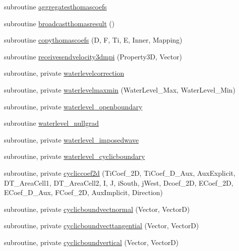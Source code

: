 \begin{DoxyCompactItemize}
subroutine \mbox{\hyperlink{namespacemodulehydrodynamic_a0d43e324a40d96741fa99e647c0d0e01}{aggregatesthomascoefs}}
\item 
subroutine \mbox{\hyperlink{namespacemodulehydrodynamic_a3dc68350b123c83700a52b23bdbf8151}{broadcastthomasresult}} ()
\item 
subroutine \mbox{\hyperlink{namespacemodulehydrodynamic_a080df16267de295975f460ddb4cba152}{copythomascoefs}} (D, F, Ti, E, Inner, Mapping)
\item 
subroutine \mbox{\hyperlink{namespacemodulehydrodynamic_a60fe8dcc9369b6f2caa9b97647a7f605}{receivesendvelocity3dmpi}} (Property3D, Vector)
\item 
subroutine, private \mbox{\hyperlink{namespacemodulehydrodynamic_a1adc02badc9c5130d372cfb28e43f796}{waterlevelcorrection}}
\item 
subroutine, private \mbox{\hyperlink{namespacemodulehydrodynamic_a4c31b8fb87415bace90b12dd41376ef4}{waterlevelmaxmin}} (Water\+Level\+\_\+\+Max, Water\+Level\+\_\+\+Min)
\item 
subroutine, private \mbox{\hyperlink{namespacemodulehydrodynamic_abc3f56e92d973f39a2bde89ee0ee561f}{waterlevel\+\_\+openboundary}}
\item 
subroutine \mbox{\hyperlink{namespacemodulehydrodynamic_a3a81c2f0eddf64c038d5a82241029379}{waterlevel\+\_\+nullgrad}}
\item 
subroutine, private \mbox{\hyperlink{namespacemodulehydrodynamic_a25549ff328b3933642ae5a9112a7d2ba}{waterlevel\+\_\+imposedwave}}
\item 
subroutine, private \mbox{\hyperlink{namespacemodulehydrodynamic_a07cbcb571bac038116c36df1b277df63}{waterlevel\+\_\+cyclicboundary}}
\item 
subroutine, private \mbox{\hyperlink{namespacemodulehydrodynamic_a51f796ba1d401f24370c5f9dd5ec71ae}{cycliccoef2d}} (Ti\+Coef\+\_\+2D, Ti\+Coef\+\_\+D\+\_\+\+Aux, Aux\+Explicit, D\+T\+\_\+\+Area\+Cell1, D\+T\+\_\+\+Area\+Cell2, I, J, i\+South, j\+West, Dcoef\+\_\+2D, E\+Coef\+\_\+2D, E\+Coef\+\_\+D\+\_\+\+Aux, F\+Coef\+\_\+2D, Aux\+Implicit, Direction)
\item 
subroutine, private \mbox{\hyperlink{namespacemodulehydrodynamic_ab70188c3f183ae7e6142adec6d3ea9fe}{cyclicboundvectnormal}} (Vector, VectorD)
\item 
subroutine, private \mbox{\hyperlink{namespacemodulehydrodynamic_a0d8c9bbfb63616e6ad93ba589923c7eb}{cyclicboundvecttangential}} (Vector, VectorD)
\item 
subroutine, private \mbox{\hyperlink{namespacemodulehydrodynamic_a700b6b9b38f8b3e2c1a84293c349c18a}{cyclicboundvertical}} (Vector, VectorD)

\end{DoxyCompactItemize}
